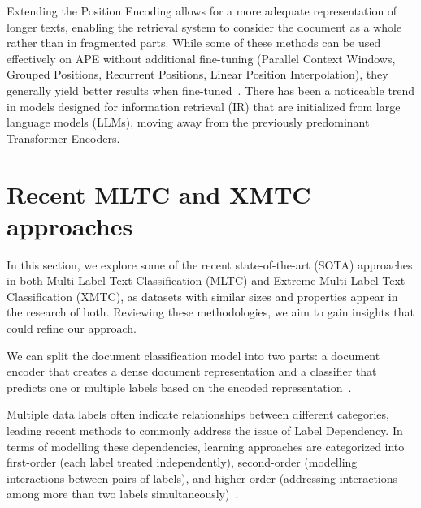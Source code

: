 Extending the Position Encoding allows for a more adequate representation of longer texts, enabling the retrieval system to consider the document as a whole rather than in fragmented parts.
While some of these methods can be used effectively on APE without additional fine-tuning (Parallel Context Windows, Grouped Positions, Recurrent Positions, Linear Position Interpolation), they generally yield better results when fine-tuned~\parencite{zhu2024longembedextendingembeddingmodels}.
There has been a noticeable trend in models designed for information retrieval (IR) that are initialized from large language models (LLMs), moving away from the previously predominant Transformer-Encoders.

\section{Recent MLTC and XMTC approaches}
In this section, we explore some of the recent state-of-the-art (SOTA) approaches in both Multi-Label Text Classification (MLTC) and Extreme Multi-Label Text Classification (XMTC), as datasets with similar sizes and properties appear in the research of both. 
Reviewing these methodologies, we aim to gain insights that could refine our approach.

We can split the document classification model into two parts: a document encoder that creates a dense document representation and a classifier that predicts one or multiple labels based on the encoded representation~\parencite{dai2022revisitingtransformer}. 

Multiple data labels often indicate relationships between different categories, leading recent methods to commonly address the issue of Label Dependency. 
In terms of modelling these dependencies, learning approaches are categorized into first-order (each label treated independently), second-order (modelling interactions between pairs of labels), and higher-order (addressing interactions among more than two labels simultaneously)~\parencite{tarekegn2024deeplearningmultilabellearning}.

